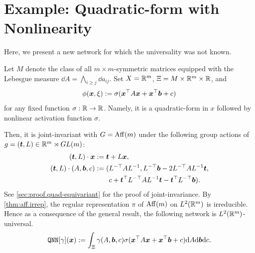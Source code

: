 \section{Example: Quadratic-form with Nonlinearity} \label{sec:quad}
Here, we present a new network for which the universality was not known.

Let $M$ denote the class of all $m \times m$-symmetric matrices
equipped with the Lebesgue measure $\dd A = \bigwedge_{i \ge j} \dd a_{ij}$.
Set $X=\mathbb{R}^m$, $\Xi = M \times \mathbb{R}^m \times \mathbb{R}$, and 
\begin{align*}
    \phi(\bm{x},\xi) := \sigma( \bm{x}^\top A \bm{x} + \bm{x}^\top \bm{b} + c )
\end{align*}
for any fixed function $\sigma:\mathbb{R}\to\mathbb{R}$.
Namely, it is a quadratic-form in $x$ followed by nonlinear activation function $\sigma$.

Then, it is joint-invariant with $G = \operatorname{Aff}(m)$ under the following group actions of $g = (\bm{t},L) \in \mathbb{R}^m\rtimes GL(m)$:
\begin{align*}
    (\bm{t},L) \cdot \bm{x} &:= \bm{t} + L\bm{x}, \\
    (\bm{t},L) \cdot (A,\bm{b},c)
    &:= (L^{-\top}AL^{-1}, L^{-\top}\bm{b}-2L^{-\top}AL^{-1}\bm{t},\\
    &\qquad c + \bm{t}^\top L^{-\top}AL^{-1}\bm{t} - \bm{t}^\top L^{-\top}\bm{b}).
\end{align*}
See \cref{sec:proof.quad-equivariant} for the proof of joint-invariance. By \cref{thm:aff.irrep}, the regular representation $\pi$ of $\operatorname{Aff}(m)$ on $L^2(\mathbb{R}^m)$ is irreducible. 
Hence as a consequence of the general result, the following network is $L^2(\mathbb{R}^m)$-universal.
\begin{align*}
    \mathtt{QNN}[\gamma](\bm{x})
    := \int_\Xi \gamma(A,\bm{b},c) \sigma(\bm{x}^\top A \bm{x} + \bm{x}^\top \bm{b} + c) \mathrm{d} A \mathrm{d} \bm{b} \mathrm{d} c.
\end{align*}
